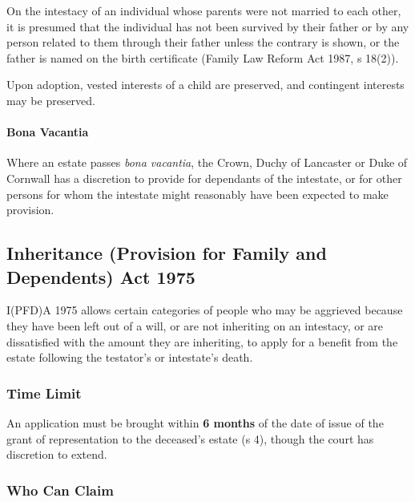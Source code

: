 \documentclass[
]{article}
\begin{document}
On the intestacy of an individual whose parents were not married to each
other, it is presumed that the individual has not been survived by their
father or by any person related to them through their father unless the
contrary is shown, or the father is named on the birth certificate
(Family Law Reform Act 1987, s 18(2)).

Upon adoption, vested interests of a child are preserved, and contingent
interests may be preserved.

\hypertarget{bona-vacantia}{%
\paragraph{Bona Vacantia}\label{bona-vacantia}}

Where an estate passes \emph{bona vacantia}, the Crown, Duchy of
Lancaster or Duke of Cornwall has a discretion to provide for dependants
of the intestate, or for other persons for whom the intestate might
reasonably have been expected to make provision.

\hypertarget{inheritance-provision-for-family-and-dependents-act-1975}{%
\subsection{Inheritance (Provision for Family and Dependents) Act
1975}\label{inheritance-provision-for-family-and-dependents-act-1975}}

I(PFD)A 1975 allows certain categories of people who may be aggrieved
because they have been left out of a will, or are not inheriting on an
intestacy, or are dissatisfied with the amount they are inheriting, to
apply for a benefit from the estate following the testator's or
intestate's death.

\hypertarget{time-limit}{%
\subsubsection{Time Limit}\label{time-limit}}

An application must be brought within \textbf{6 months} of the date of
issue of the grant of representation to the deceased's estate (s 4),
though the court has discretion to extend.

\hypertarget{who-can-claim}{%
\subsubsection{Who Can Claim}\label{who-can-claim}}
\end{document}

